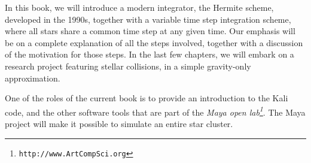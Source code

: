 \documentclass{book}
\begin{document}
In this book, we will introduce a modern integrator, the Hermite
scheme, developed in the 1990s, together with a variable time step
integration scheme, where all stars share a common time step at any
given time.  Our emphasis will be on a complete explanation of all the
steps involved, together with a discussion of the motivation for those
steps.  In the last few chapters, we will embark on a research project
featuring stellar collisions, in a simple gravity-only approximation.

One of the roles of the current book is to provide an introduction to
the Kali code, and the other software tools that are part of the
 {\it Maya open lab\footnote{\tt http://www.ArtCompSci.org}}.  The Maya project
will make it possible to simulate an entire star cluster.

    
\end{document}
